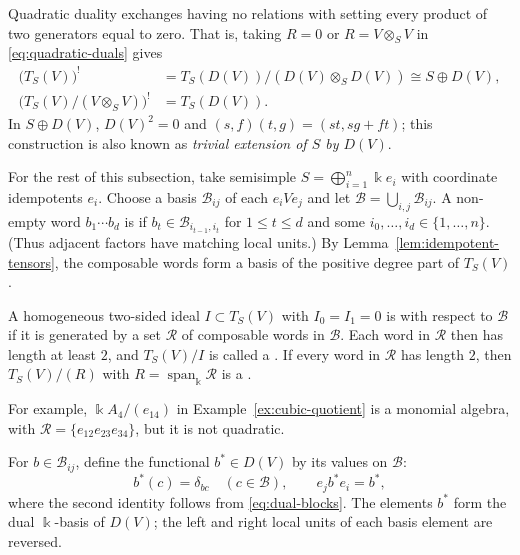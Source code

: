 \begin{advanced}
\begin{example}\label{ex:tensor-square-zero-dual}
Quadratic duality exchanges having no relations with setting every product of two generators equal to zero.
That is, taking $R=0$ or $R=V\otimes_S V$ in \eqref{eq:quadratic-duals} gives
\[
\begin{aligned}
\bigl(T_S(V)\bigr)^!
&=T_S(D(V))/(D(V)\otimes_S D(V))\cong S\oplus D(V),\\
\bigl(T_S(V)/(V\otimes_S V)\bigr)^!&=T_S(D(V)).
\end{aligned}
\]
In $S\oplus D(V)$, $D(V)^2=0$ and $(s,f)(t,g)=(st,sg+ft)$; this construction is also known as \emph{trivial extension of $S$ by $D(V)$}.
\end{example}

For the rest of this subsection, take semisimple $S=\bigoplus_{i=1}^n\Bbbk e_i$ with coordinate idempotents $e_i$.
Choose a basis $\mathcal B_{ij}$ of each $e_iVe_j$ and let $\mathcal B=\bigcup_{i,j}\mathcal B_{ij}$.
A non-empty word $b_1\cdots b_d$ is  if $b_t\in\mathcal B_{i_{t-1},i_t}$ for $1\leq t\leq d$ and some $i_0,\ldots,i_d\in\{1,\ldots,n\}$.
(Thus adjacent factors have matching local units.)
By Lemma~\ref{lem:idempotent-tensors}, the composable words form a basis of the positive degree part of $T_S(V)$.

\begin{definition}\label{def:monomial}
A homogeneous two-sided ideal $I\subset T_S(V)$ with $I_0=I_1=0$ is  with respect to $\mathcal B$ if it is generated by a set $\mathcal R$ of composable words in $\mathcal B$.
Each word in $\mathcal R$ then has length at least $2$, and $T_S(V)/I$ is called a .
If every word in $\mathcal R$ has length $2$, then $T_S(V)/(R)$ with $R=\operatorname{span}_\Bbbk\mathcal R$ is a .
\end{definition}

For example, $\Bbbk A_4/(e_{14})$ in Example~\ref{ex:cubic-quotient} is a monomial algebra, with $\mathcal R=\{e_{12}e_{23}e_{34}\}$, but it is not quadratic.

For $b\in\mathcal B_{ij}$, define the functional $b^*\in D(V)$ by its values on $\mathcal B$:
\begin{equation}\label{eq:dual-basis-idempotents}
b^*(c)=\delta_{bc}\quad(c\in\mathcal B),
\qquad e_jb^*e_i=b^*,
\end{equation}
where the second identity follows from \eqref{eq:dual-blocks}.
The elements $b^*$ form the dual $\Bbbk$-basis of $D(V)$; the left and right local units of each basis element are reversed.


\end{advanced}
